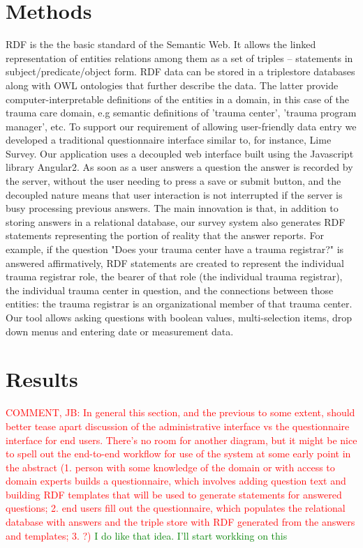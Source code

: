 \documentclass{amia}
\begin{document}
\section*{Methods}
RDF is the the basic standard of the Semantic Web. It allows the linked representation of entities relations among them as a set of triples -- statements in subject/predicate/object form. RDF data can be stored in a triplestore databases along with OWL ontologies that further describe the data. The latter provide computer-interpretable definitions of the entities in  a domain, in this case of the trauma care domain, e.g semantic definitions of 'trauma center', 'trauma program manager', etc. 
To support our requirement of allowing user-friendly data entry we developed a traditional questionnaire interface similar to, for instance, Lime Survey\cite{TODO}. 
Our application uses a decoupled web interface built using the Javascript library Angular2\cite{TODO}.
As soon as a user answers a question the answer is recorded by the server, without the user needing to press a save or submit button, and the decoupled nature means that user interaction is not interrupted if the server is busy processing previous answers.
The main innovation is that, in addition to storing answers in a relational database, our survey system also generates RDF statements representing the portion of reality that the answer reports.
For example, if the question "Does your trauma center have a trauma registrar?" is answered affirmatively, RDF statements are created to represent the individual trauma registrar role, the bearer of that role (the individual trauma registrar), the individual trauma center in question, and the connections between those entities: the trauma registrar is an organizational member of that trauma center.
Our tool allows asking questions with boolean values, multi-selection items, drop down menus and entering date or measurement data.

\section*{Results}
\textcolor{red}{
COMMENT, JB: In general this section, and the previous to some extent, should better tease apart discussion of the administrative interface vs the questionnaire interface for end users. There's no room for another diagram, but it might be nice to spell out the end-to-end workflow for use of the system at some early point in the abstract (1. person with some knowledge of the domain or with access to domain experts builds a questionnaire, which involves adding question text and building RDF templates that will be used to generate statements for answered questions; 2. end users fill out the questionnaire, which populates the relational database with answers and the triple store with RDF generated from the answers and templates; 3. ?)}
\textcolor{green}{I do like that idea. I'll start workking on this}
\end{document}
